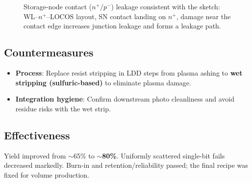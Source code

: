 \begin{figure}[t]
  \caption{Storage-node contact ($n^+/p^-$) leakage consistent with the sketch:
  WL--$n^+$--LOCOS layout, SN contact landing on $n^+$, damage near the contact
  edge increases junction leakage and forms a leakage path.}
  \label{fig:storage_contact_tikz}
\end{figure}

\subsection{Countermeasures}
\begin{itemize}
  \item \textbf{Process}: Replace resist stripping in LDD steps from plasma ashing to \textbf{wet stripping (sulfuric-based)} to eliminate plasma damage. 
  \item \textbf{Integration hygiene}: Confirm downstream photo cleanliness and avoid residue risks with the wet strip.
\end{itemize}

\subsection{Effectiveness}
Yield improved from $\sim$65\% to \textbf{$\sim$80\%}. Uniformly scattered single-bit fails decreased markedly. Burn-in and retention/reliability passed; the final recipe was fixed for volume production.

